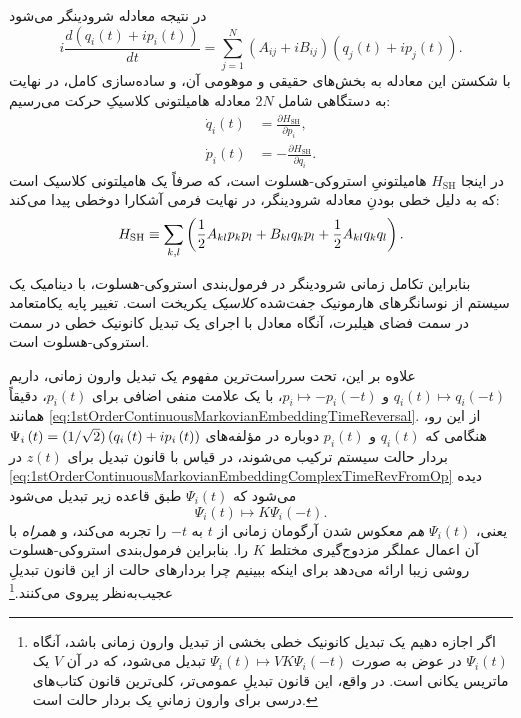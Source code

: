 \documentclass{article}
\begin{document}
در نتیجه معادله شرودینگر می‌شود
\begin{equation}
i\frac{d\left(q_{i}\left(t\right)+ip_{i}\left(t\right)\right)}{dt}=\sum_{j=1}^{N}\left(A_{ij}+iB_{ij}\right)\left(q_{j}\left(t\right)+ip_{j}\left(t\right)\right).\label{eq:SchroEqRealComponentsIntermed}
\end{equation}
 با شکستن این معادله به بخش‌های حقیقی و موهومی آن، و ساده‌سازی کامل، در نهایت به دستگاهی شامل $2N$ معادله هامیلتونی کلاسیکِ حرکت می‌رسیم:
\begin{equation}
\begin{aligned}\dot{q}_{i}\left(t\right) & =\frac{\partial H_{\textrm{SH}}}{\partial p_{i}},\\
\dot{p}_{i}\left(t\right) & =-\frac{\partial H_{\textrm{SH}}}{\partial q_{i}}.
\end{aligned}
\label{eq:StrocchiHeslotHamiltonEqs}
\end{equation}
 در اینجا $H_{\textrm{SH}}$ هامیلتونیِ استروکی-هسلوت است، که صرفاً یک هامیلتونی کلاسیک است که به دلیل خطی بودنِ معادله شرودینگر، در نهایت فرمی آشکارا دوخطی پیدا می‌کند:
\begin{equation}
H_{\textrm{SH}}\equiv\sum_{k,l}\left(\frac{1}{2}A_{kl}p_{k}p_{l}+B_{kl}q_{k}p_{l}+\frac{1}{2}A_{kl}q_{k}q_{l}\right).\label{eq:StrocchiHeslotClassicalHamiltonian}
\end{equation}

بنابراین تکامل زمانی شرودینگر در فرمول‌بندی استروکی-هسلوت، با دینامیک یک سیستم از نوسانگرهای هارمونیک جفت‌شده \emph{کلاسیک} یکریخت است. تغییر پایه یکامتعامد در سمت فضای هیلبرت، آنگاه معادل با اجرای یک تبدیل کانونیک خطی در سمت استروکی-هسلوت است.

علاوه بر این، تحت سرراست‌ترین مفهوم یک تبدیل وارون زمانی، داریم $q_{i}\left(t\right)\mapsto q_{i}\left(-t\right)$ و $p_{i}\mapsto-p_{i}\left(-t\right)$، با یک علامت منفی اضافی برای $p_{i}\left(t\right)$، دقیقاً همانند \eqref{eq:1stOrderContinuousMarkovianEmbeddingTimeReversal}. از این رو، هنگامی که $q_{i}\left(t\right)$ و $p_{i}\left(t\right)$ دوباره در مؤلفه‌های $\Psi_{i}\left(t\right)=(1/\sqrt{2})\left(q_{i}\left(t\right)+ip_{i}\left(t\right)\right)$ بردار حالت سیستم ترکیب می‌شوند، در قیاس با قانون تبدیل برای $z\left(t\right)$ در \eqref{eq:1stOrderContinuousMarkovianEmbeddingComplexTimeRevFromOp} دیده می‌شود که $\Psi_{i}\left(t\right)$ طبق قاعده زیر تبدیل می‌شود
\begin{equation}
\Psi_{i}\left(t\right)\mapsto K\Psi_{i}\left(-t\right).\label{eq:TimeReversalStateVectorComponents}
\end{equation}
 یعنی، $\Psi_{i}\left(t\right)$ \emph{هم} معکوس شدن آرگومان زمانی از $t$ به $-t$ را تجربه می‌کند، و \emph{همراه} با آن اعمال عملگر مزدوج‌گیری مختلط $K$ را. بنابراین فرمول‌بندی استروکی-هسلوت روشی زیبا ارائه می‌دهد برای اینکه ببینیم چرا بردارهای حالت از این قانون تبدیلِ عجیب‌به‌نظر پیروی می‌کنند.\footnote{اگر اجازه دهیم یک تبدیل کانونیک خطی بخشی از تبدیل وارون زمانی باشد، آنگاه $\Psi_{i}\left(t\right)$ در عوض به صورت $\Psi_{i}\left(t\right)\mapsto VK\Psi_{i}\left(-t\right)$ تبدیل می‌شود، که در آن $V$ یک ماتریس یکانی است. در واقع، این قانون تبدیلِ عمومی‌تر، کلی‌ترین قانون کتاب‌های درسی برای وارون زمانیِ یک بردار حالت است.}
\end{document}
